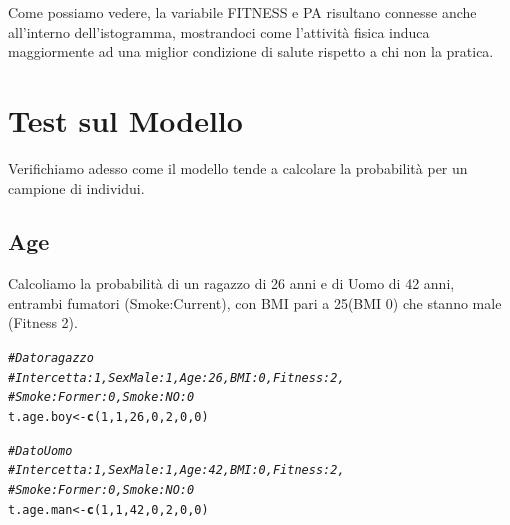 \documentclass{article}\usepackage[]{graphicx}\usepackage[]{xcolor}
\makeatletter
\newcommand{\hlnum}[1]{\textcolor[rgb]{0.686,0.059,0.569}{#1}}%
\newcommand{\hlcom}[1]{\textcolor[rgb]{0.678,0.584,0.686}{\textit{#1}}}%
\newcommand{\hlstd}[1]{\textcolor[rgb]{0.345,0.345,0.345}{#1}}%
\newcommand{\hlkwb}[1]{\textcolor[rgb]{0.69,0.353,0.396}{#1}}%
\newcommand{\hlkwd}[1]{\textcolor[rgb]{0.737,0.353,0.396}{\textbf{#1}}}%
\newenvironment{kframe}{%
 \def\at@end@of@kframe{}%
 \ifinner\ifhmode%
  \def\at@end@of@kframe{\end{minipage}}%
  \begin{minipage}{\columnwidth}%
 \fi\fi%
 \def\FrameCommand##1{\hskip\@totalleftmargin \hskip-\fboxsep
 \colorbox{shadecolor}{##1}\hskip-\fboxsep
     \hskip-\linewidth \hskip-\@totalleftmargin \hskip\columnwidth}%
 \MakeFramed {\advance\hsize-\width
   \@totalleftmargin\z@ \linewidth\hsize
   \@setminipage}}%
 {\par\unskip\endMakeFramed%
 \at@end@of@kframe}
\newenvironment{knitrout}{}{} %
\makeatother
\begin{document}
    Come possiamo vedere, la variabile FITNESS e PA risultano connesse anche 
    all'interno dell'istogramma, mostrandoci come l'attività fisica induca
    maggiormente ad una miglior condizione di salute rispetto a chi non la
    pratica.
    

\clearpage


\section{Test sul Modello}
  Verifichiamo adesso come il modello tende a calcolare la probabilità per un         campione di individui.
  
  \subsection{Age}
    Calcoliamo la probabilità di un ragazzo di 26 anni e di Uomo di 42 anni, 
    entrambi fumatori (Smoke:Current), con BMI pari a 25(BMI 0) che stanno male 
    (Fitness 2).
      
\begin{knitrout}
\color{fgcolor}\begin{kframe}
\begin{alltt}
\hlcom{#Dato ragazzo}
\hlcom{#Intercetta: 1, SexMale: 1, Age: 26, BMI: 0, Fitness: 2, }
\hlcom{#Smoke:Former: 0, Smoke:NO: 0 }
\hlstd{t.age.boy} \hlkwb{<-} \hlkwd{c}\hlstd{(}\hlnum{1}\hlstd{,} \hlnum{1}\hlstd{,} \hlnum{26}\hlstd{,} \hlnum{0}\hlstd{,} \hlnum{2}\hlstd{,} \hlnum{0}\hlstd{,} \hlnum{0}\hlstd{)}

\hlcom{#Dato Uomo}
\hlcom{#Intercetta: 1, SexMale: 1, Age: 42, BMI: 0, Fitness: 2, }
\hlcom{#Smoke:Former: 0, Smoke:NO: 0 }
\hlstd{t.age.man} \hlkwb{<-} \hlkwd{c}\hlstd{(}\hlnum{1}\hlstd{,} \hlnum{1}\hlstd{,} \hlnum{42}\hlstd{,} \hlnum{0}\hlstd{,} \hlnum{2}\hlstd{,} \hlnum{0}\hlstd{,} \hlnum{0}\hlstd{)}
\end{alltt}
\end{kframe}
\end{knitrout}
    
\end{document}
